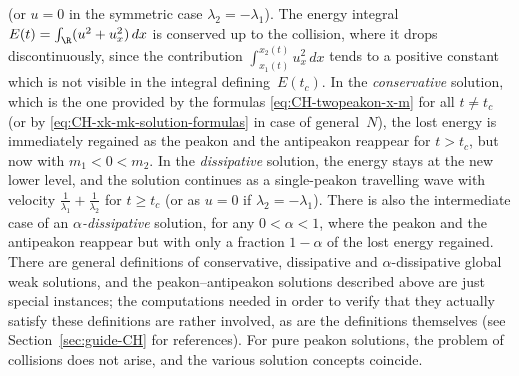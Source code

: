\documentclass[10pt,a4paper]{article} \pdfoutput=1 
\begin{document}
\begin{example}
  (or $u=0$ in the symmetric case $\lambda_2 = -\lambda_1$).
  The energy integral $E(t) = \int_{\R} (u^2 + u_x^2) \, dx$
  is conserved up to the collision, where it drops discontinuously,
  since the contribution $\int_{x_1(t)}^{x_2(t)} u_x^2 \, dx$ tends to a positive constant
  which is not visible in the integral defining~$E(t_c)$.
  In the \emph{conservative} solution, which is the one provided by the formulas
  \eqref{eq:CH-twopeakon-x-m} for all $t \neq t_c$
  (or by \eqref{eq:CH-xk-mk-solution-formulas} in case of general~$N$),
  the lost energy is immediately regained as the peakon and the antipeakon reappear for $t>t_c$,
  but now with $m_1 < 0 < m_2$.
  In the \emph{dissipative} solution, the energy stays at the new lower level,
  and the solution continues as a single-peakon travelling wave with velocity $\tfrac{1}{\lambda_1} + \tfrac{1}{\lambda_2}$
  for $t \ge t_c$
  (or as $u=0$ if $\lambda_2 = -\lambda_1$).
  There is also the intermediate case of an \emph{$\alpha$-dissipative} solution, for any $0 < \alpha < 1$,
  where the peakon and the antipeakon reappear but with only a fraction $1-\alpha$ of the lost energy
  regained.
  There are general definitions of conservative, dissipative and $\alpha$-dissipative
  global weak solutions, and the peakon--antipeakon solutions described above are just special instances;
  the computations needed in order to verify that they actually satisfy these definitions
  are rather involved, as are the definitions themselves (see Section~\ref{sec:guide-CH} for references).
  For pure peakon solutions, the problem of collisions does not arise, and the various solution concepts coincide.


\end{example}
\end{document}
